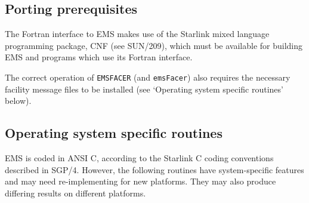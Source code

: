 \documentclass[twoside,11pt]{article}
\newcommand{\htmlref}[2]{#1}
\newcommand{\latex}[1]{#1}
\newcommand{\xref}[3]{#1}
\newcommand{\xlabel}[1]{}
\renewcommand{\_}{\texttt{\symbol{95}}}
\begin{document}
\subsection{\xlabel{porting_prerequisites}Porting prerequisites}
The Fortran interface to EMS makes use of the Starlink mixed language
programming package,
\xref{CNF}{sun209}{}\latex{ (see SUN/209)},
which must be available for building EMS and programs which use its Fortran
interface.

The correct operation of \texttt{EMS\_FACER} (and \texttt{emsFacer}) also
requires the necessary facility message files to be installed (see 
\htmlref{`Operating system specific routines'\latex{ below}}
{operating_system_specific_routines}).

\subsection{\xlabel{operating_system_specific_routines}Operating system
specific routines}
\label{deps}
EMS is coded in ANSI C, according to the Starlink C coding conventions 
described in SGP/4.
However, the following routines have system-specific features and may need
re-implementing for new platforms.
They may also produce differing results on different platforms.
\end{document}
